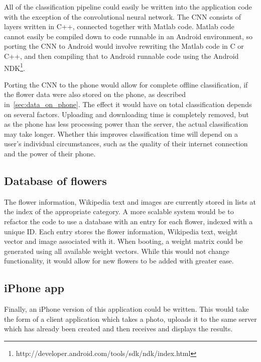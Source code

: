 \documentclass[11pt, a4paper]{report}
\begin{document}
All of the classification pipeline could easily be written into the application code with the exception of the convolutional neural network. The CNN consists of layers written in C++, connected together with Matlab code. Matlab code cannot easily be compiled down to code runnable in an Android environment, so porting the CNN to Android would involve rewriting the Matlab code in C or C++, and then compiling that to Android runnable code using the Android NDK\footnote{http://developer.android.com/tools/sdk/ndk/index.html}. 

Porting the CNN to the phone would allow for complete offline classification, if the flower data were also stored on the phone, as described in~\ref{sec:data_on_phone}. The effect it would have on total classification depends on several factors. Uploading and downloading time is completely removed, but as the phone has less processing power than the server, the actual classification may take longer. Whether this improves classification time will depend on a user's individual circumstances, such as the quality of their internet connection and the power of their phone.


\subsection{Database of flowers}

The flower information, Wikipedia text and images are currently stored in lists at the index of the appropriate category. A more scalable system would be to refactor the code to use a database with an entry for each flower, indexed with a unique ID. Each entry stores the flower information, Wikipedia text, weight vector and image associated with it. When booting, a weight matrix could be generated using all available weight vectors. While this would not change functionality, it would allow for new flowers to be added with greater ease.

\subsection{iPhone app}

Finally, an iPhone version of this application could be written. This would take the form of a client application which takes a photo, uploads it to the same server which has already been created and then receives and displays the results. 




\printbibliography
\end{document}
